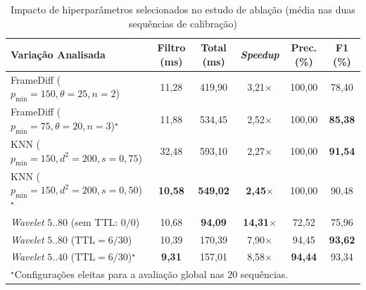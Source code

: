 \documentclass{ieeeaccess}
\begin{document}
\begin{table}[t!]
\caption{Impacto de hiperparâmetros selecionados no estudo de ablação (média nas duas sequências de calibração)}
\label{tab:ablacao}
\centering
\setlength{\tabcolsep}{3.5pt}
\begin{tabular}{lccccc}
\toprule
\textbf{Variação Analisada} & \textbf{Filtro (ms)} & \textbf{Total (ms)} & \textbf{\textit{Speedup}} & \textbf{Prec. (\%)} & \textbf{F1 (\%)} \\
\midrule
FrameDiff ($p_{\min}\!=\!150, \theta\!=\!25, n\!=\!2$) & 11,28 & 419,90 & 3,21$\times$ & 100,00 & 78,40 \\
FrameDiff ($p_{\min}\!=\!75, \theta\!=\!20, n\!=\!3$)$^{\star}$  & 11,88 & 534,45 & 2,52$\times$ & 100,00 & \textbf{85,38} \\
\midrule
KNN ($p_{\min}\!=\!150, d^2\!=\!200, s\!=\!0{,}75$) & 32,48 & 593,10 & 2,27$\times$ & 100,00 & \textbf{91,54} \\
KNN ($p_{\min}\!=\!150, d^2\!=\!200, s\!=\!0{,}50$)$^{\star}$ & \textbf{10,58} & \textbf{549,02} & \textbf{2,45$\times$} & 100,00 & 90,48 \\
\midrule
\textit{Wavelet} $5..80$ (sem TTL: $0/0$)    & 10,68 & \textbf{94,09}  & \textbf{14,31$\times$} & 72,52  & 75,96 \\
\textit{Wavelet} $5..80$ ($\text{TTL}\!=\!6/30$)     & 10,39 & 170,39 & 7,90$\times$  & 94,45  & \textbf{93,62} \\
\textit{Wavelet} $5..40$ ($\text{TTL}\!=\!6/30$)$^{\star}$    & \textbf{9,31}  & 157,01 & 8,58$\times$  & \textbf{94,44}  & 93,34 \\
\bottomrule
\multicolumn{6}{l}{\scriptsize $^{\star}$Configurações eleitas para a avaliação global nas 20 sequências.}
\end{tabular}
\end{table}
\end{document}
